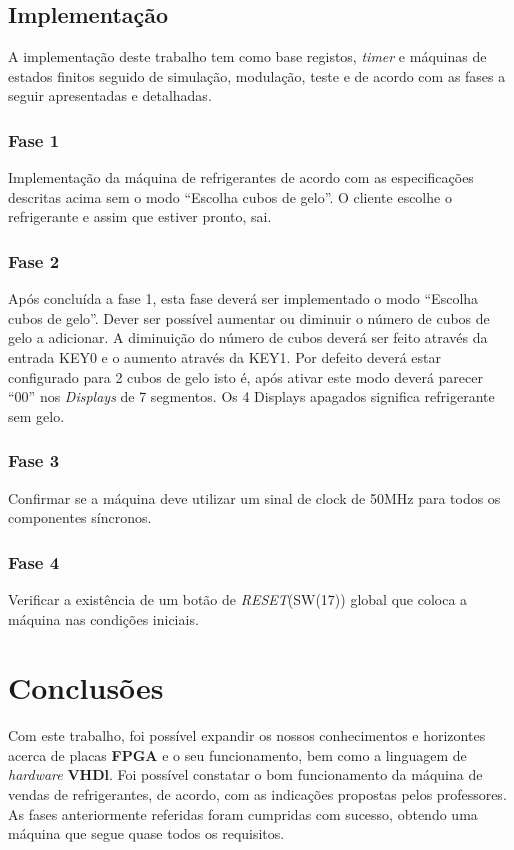 \documentclass{report}
\begin{document}
\section{Implementação}
A implementação deste trabalho tem como base registos, \textit{timer} e máquinas de estados finitos \cite{ericmccreath2008} seguido de simulação, modulação, teste e de acordo com as fases a seguir apresentadas e detalhadas.

\subsection{Fase 1}
Implementação da máquina de refrigerantes de acordo com as especificações descritas acima sem o modo “Escolha cubos de gelo”. O cliente escolhe o refrigerante e assim que estiver pronto, sai.

\subsection{Fase 2}
Após concluída a fase 1, esta fase deverá ser implementado o modo “Escolha cubos de gelo”. Dever ser possível aumentar ou diminuir o número de cubos de gelo a adicionar. A diminuição do número de cubos deverá ser feito através da entrada KEY0 e o aumento através da KEY1. Por defeito deverá estar configurado para 2 cubos de gelo isto é, após ativar este modo deverá parecer “00” nos \textit{Displays} de 7 segmentos. Os 4 Displays apagados significa refrigerante sem gelo.

\subsection{Fase 3}
Confirmar se a máquina deve utilizar um sinal de clock de 50MHz para todos os componentes síncronos.

\subsection{Fase 4}
Verificar a existência de um botão de \textit{RESET}(SW(17)) global que coloca a máquina nas condições iniciais.

\chapter{Conclusões}
\label{chap.conclusao}
Com este trabalho, foi possível expandir os nossos conhecimentos e horizontes acerca de placas \textbf{FPGA} e o seu funcionamento, bem como a linguagem de \textit{hardware} \textbf{VHDl}. Foi possível constatar o bom funcionamento da máquina de vendas de refrigerantes, de acordo, com as indicações propostas pelos professores. As fases anteriormente referidas foram cumpridas com sucesso, obtendo uma máquina que segue quase todos os requisitos.
\end{document}
